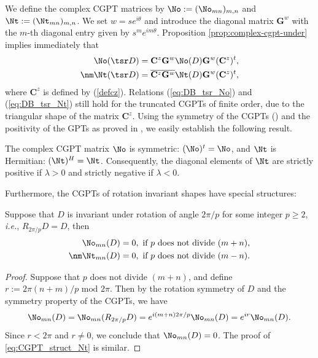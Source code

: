 We define the complex  CGPT matrices by $\No:= (\No_{mn})_{m,n}$
and $\Nt:= (\Nt_{mn})_{m,n}$. We set $w=se^{i\theta}$ and
introduce the diagonal matrix $\mathbf{G}^w$ with the $m$-th
diagonal entry given by $s^me^{im\theta}$. Proposition
\ref{prop:complex-cgpt-under} implies immediately that
\begin{align}
  \No(\tsr D) &= \mathbf{C}^z \mathbf{G}^w\No(D) \mathbf{G}^w(\mathbf{C}^z)^t ,\label{eq:DB_tsr_No}\\
  \nm
  \Nt(\tsr D) &= \overline{\mathbf{C}^z \mathbf{G}^w}\Nt(D) \mathbf{G}^w(\mathbf{C}^z)^t, \label{eq:DB_tsr_Nt}
\end{align}
where $\mathbf{C}^z$ is defined by (\ref{defcz}). Relations
(\ref{eq:DB_tsr_No}) and (\ref{eq:DB_tsr_Nt}) still hold for the
truncated CGPTs of finite order, due to the triangular shape of
the matrix $\mathbf{C}^z$.
Using the symmetry  of the CGPTs (\cite[Theorem
4.11]{ammari2007polarization}) and the positivity of the GPTs as
proved in \cite{ammari2007polarization}, we  easily establish
the following result.
\begin{proposition}
  \label{prop:CGPT_symm_herm}
  The complex CGPT matrix $\No$ is symmetric: $(\No)^t = \No$, and $\Nt$ is
  Hermitian: $(\Nt)^H = \Nt$. Consequently, the diagonal elements of
  $\Nt$ are strictly positive if $\lambda >0$ and strictly negative if $\lambda <0$.
\end{proposition}

Furthermore, the CGPTs of rotation invariant shapes have special
structures:
\begin{proposition}
  \label{prop:CGPT_rotsymm_struct}
  Suppose that $D$ is invariant under rotation of angle $2\pi/p$ for
  some integer $p\geq 2$, \emph{i.e.}, $R_{2\pi/p}D = D$, then
  \begin{align}
    \No_{mn}(D) = 0, \mbox{ if } p \mbox{ does not divide }  (m+n) \label{eq:CGPT_struct_No},\\
    \nm
    \Nt_{mn}(D) = 0, \mbox{ if } p \mbox{ does not divide } (m-n).
    \label{eq:CGPT_struct_Nt}
  \end{align}
\end{proposition}
\begin{proof}
  Suppose that $p$ does not divide $(m+n)$, and define $r:=2\pi(n+m)/p \mbox{ mod }
  2\pi$. Then by the rotation symmetry of $D$ and the symmetry property
  of the
  CGPTs, we have
  $$
  \No_{mn}(D) = \No_{mn}(R_{2\pi /p}D) = e^{i(m+n)2\pi/p}\No_{mn}(D) =
  e^{ir}\No_{mn}(D).
  $$
  Since $r<2\pi$ and $r\neq 0$, we conclude that $\No_{mn}(D)=0$. The
  proof of \eqref{eq:CGPT_struct_Nt} is similar.
\end{proof}



